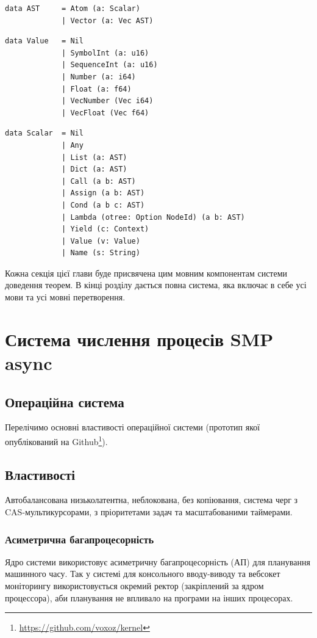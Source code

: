 \begin{lstlisting}
data AST     = Atom (a: Scalar)
             | Vector (a: Vec AST)
\end{lstlisting}

\begin{lstlisting}
data Value   = Nil
             | SymbolInt (a: u16)
             | SequenceInt (a: u16)
             | Number (a: i64)
             | Float (a: f64)
             | VecNumber (Vec i64)
             | VecFloat (Vec f64)
\end{lstlisting}

\begin{lstlisting}
data Scalar  = Nil
             | Any
             | List (a: AST)
             | Dict (a: AST)
             | Call (a b: AST)
             | Assign (a b: AST)
             | Cond (a b c: AST)
             | Lambda (otree: Option NodeId) (a b: AST)
             | Yield (c: Context)
             | Value (v: Value)
             | Name (s: String)
\end{lstlisting}

Кожна секція цієї глави буде присвячена цим мовним компонентам
системи доведення теорем. В кінці розділу дається повна система, яка включає в себе усі
мови та усі мовні перетворення.

\section{Система числення процесів SMP async}

\subsection{Операційна система}
Перелічимо основні властивості операційної системи (прототип
якої опублікований на Github\footnote{\url{https://github.com/voxoz/kernel}}).

\subsection{Властивості}
Автобалансована низьколатентна, неблокована, без копіювання, система черг
з CAS-мультикурсорами, з пріоритетами задач та масштабованими таймерами.

\subsubsection{Асиметрична багапроцесорність}
Ядро системи використовує асиметричну багапроцесорність (АП)
для планування машинного часу. Так у системі для консольного
вводу-виводу та вебсокет моніторингу використовується окремий
ректор (закріплений за ядром процессора),
аби планування не впливало на програми на інших процесорах.

